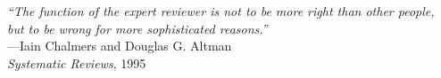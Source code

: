 \documentclass[11pt,a4paper,twoside,openany]{book}\usepackage{knitr}
\makeatletter
\def\cleardoublepage{\clearpage\if@twoside
\ifodd\c@page
\else\hbox{}\thispagestyle{empty}\newpage
\if@twocolumn\hbox{}\newpage\fi\fi\fi}
\makeatother
\begin{document}
%

\begin{flushright}
\null{}
\textit{``The function of the expert reviewer is not to be more right than other people, \\
but to be wrong for more sophisticated reasons.''} \\
---Iain Chalmers and Douglas G. Altman \\ 
\textit{Systematic Reviews}, 1995
\null
\end{flushright}

\cleardoublepage 
\pagestyle{frontmatter}

%
\end{document}
